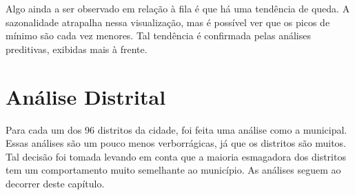 \documentclass[12pt, a4]{book}
\begin{document}
Algo ainda a ser observado em relação à fila é que há uma tendência de queda. A sazonalidade atrapalha nessa visualização, mas é possível ver que os picos de mínimo são cada vez menores. Tal tendência é confirmada pelas análises preditivas, exibidas mais à frente.

\chapter{Análise Distrital}

Para cada um dos 96 distritos da cidade, foi feita uma análise como a municipal. Essas análises são um pouco menos verborrágicas, já que os distritos são muitos. Tal decisão foi tomada levando em conta que a maioria esmagadora dos distritos tem um comportamento muito semelhante ao município. As análises seguem ao decorrer deste capítulo.
			
\newpage


																										
\end{document}

